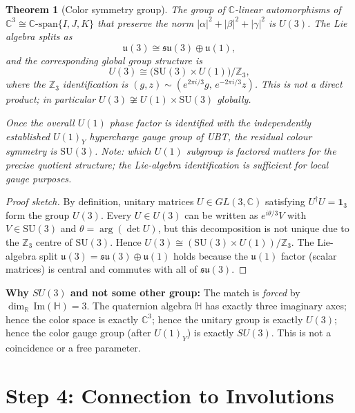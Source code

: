 \documentclass[12pt,a4paper]{article}
\newtheorem{theorem}{Theorem}[section]
\theoremstyle{definition}
\theoremstyle{remark}
\begin{document}
\begin{theorem}[Color symmetry group]
\label{thm:color_symmetry}
The group of $\mathbb{C}$-linear automorphisms of
$\mathbb{C}^3 \cong \mathbb{C}\text{-span}\{I,J,K\}$ that preserve the norm
$|\alpha|^2 + |\beta|^2 + |\gamma|^2$ is $U(3)$.  The Lie algebra splits as
\[
  \mathfrak{u}(3) \cong \mathfrak{su}(3)\oplus\mathfrak{u}(1),
\]
and the corresponding global group structure is
\[
  U(3) \cong \bigl(\mathrm{SU}(3)\times U(1)\bigr)/\mathbb{Z}_3,
\]
where the $\mathbb{Z}_3$ identification is
$(g,z)\sim(e^{2\pi i/3}g,\,e^{-2\pi i/3}z)$.
This is \emph{not} a direct product; in particular
$U(3) \not\cong U(1)\times\mathrm{SU}(3)$ globally.

Once the overall $U(1)$ phase factor is identified with the independently
established $U(1)_Y$ hypercharge gauge group of UBT, the residual colour symmetry
is $\mathrm{SU}(3)$.
Note: which $U(1)$ subgroup is factored matters for the precise quotient
structure; the Lie-algebra identification is sufficient for local gauge purposes.
\end{theorem}

\begin{proof}[Proof sketch]
By definition, unitary matrices $U \in GL(3,\mathbb{C})$ satisfying
$U^\dagger U = \mathbf{1}_3$ form the group $U(3)$.
Every $U\in U(3)$ can be written as $e^{i\theta/3} V$ with $V\in\mathrm{SU}(3)$
and $\theta=\arg(\det U)$, but this decomposition is not unique due to the
$\mathbb{Z}_3$ centre of $\mathrm{SU}(3)$.  Hence
$U(3)\cong(\mathrm{SU}(3)\times U(1))/\mathbb{Z}_3$.
The Lie-algebra split $\mathfrak{u}(3)=\mathfrak{su}(3)\oplus\mathfrak{u}(1)$
holds because the $\mathfrak{u}(1)$ factor (scalar matrices) is central and
commutes with all of $\mathfrak{su}(3)$.
\end{proof}

\begin{insightbox}
\textbf{Why $SU(3)$ and not some other group:}
The match is \emph{forced} by $\dim_\mathbb{R}\,\mathrm{Im}(\mathbb{H}) = 3$.
The quaternion algebra $\mathbb{H}$ has exactly three imaginary axes; hence
the color space is exactly $\mathbb{C}^3$; hence the unitary group is exactly
$U(3)$; hence the color gauge group (after $U(1)_Y$) is exactly $SU(3)$.
This is not a coincidence or a free parameter.
\end{insightbox}

\section{Step 4: Connection to Involutions}
\label{sec:involutions}
\end{document}
